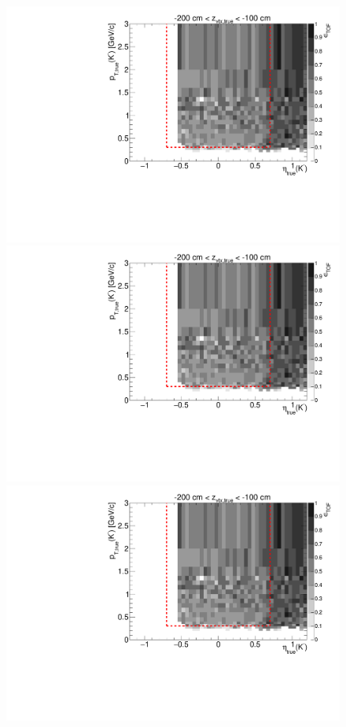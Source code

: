 \begin{figure}[hb]\ContinuedFloat
\centering
\parbox{0.495\textwidth}{
  \centering
  \includegraphics[width=\linewidth,page=11]{graphics/eff/Eff2D_TOF_kaon_Minus.pdf}\\
  \includegraphics[width=\linewidth,page=13]{graphics/eff/Eff2D_TOF_kaon_Minus.pdf}\\
  \includegraphics[width=\linewidth,page=15]{graphics/eff/Eff2D_TOF_kaon_Minus.pdf}\\
}
\end{figure}
